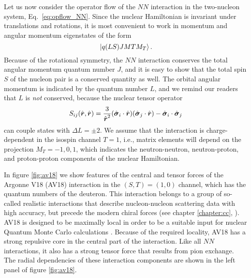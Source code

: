 Let us now consider the operator flow of the $NN$ interaction
in the two-nucleon system, Eq.~\eqref{eq:opflow_NN}. Since the nuclear Hamiltonian is invariant
under translations and rotations, it is most convenient to work in
momentum and angular momentum eigenstates of the form
\begin{equation}
  \,|{q(LS)JMTM_T}\rangle\,.
\end{equation}
Because of the rotational symmetry, the $NN$ interaction conserves
the total angular momentum quantum number $J$, and it is easy to show 
that the total spin $S$ of the nucleon pair is a conserved quantity as 
well. The
orbital angular momentum is indicated by the quantum number $L$,
and we remind our readers that $L$ is \emph{not} conserved, because
the nuclear tensor operator
\begin{equation}
  S_{ij}(\rOV,\rOV) = \frac{3}{\rOV^2}(\sigmaOV_i\cdot\rOV)(\sigmaOV_j\cdot\rOV)-\sigmaOV_i\cdot\sigmaOV_{j}
\end{equation}
can couple states with $\Delta L = \pm 2$. We
assume that the interaction is charge-dependent in the isospin channel
$T=1$, i.e., matrix elements will depend on the projection $M_T=-1,0,1$, 
which indicates the neutron-neutron, neutron-proton, and proton-proton 
components of the nuclear Hamiltonian. 


In figure \ref{fig:av18} we show features of the central 
and tensor forces of the Argonne V18 (AV18) interaction \cite{Wiringa:1995or}
in the $(S,T)=(1,0)$ channel, which has the quantum numbers of the deuteron. This 
interaction belongs to a group of so-called
realistic interactions that describe nucleon-nucleon scattering data
with high accuracy, but precede the modern chiral forces (see
chapter \ref{chapter:cc}, \cite{Epelbaum:2009ve,Machleidt:2011bh}). AV18
is designed to be maximally local in order to be a suitable input for
nuclear Quantum Monte Carlo calculations \cite{Carlson:2015lq,Gezerlis:2014zr,
Lynn:2016ec}. Because of the required locality, AV18 has a strong repulsive
core in the central part of the interaction. Like all $NN$ interactions,
it also has a strong tensor force that results from pion exchange. The
radial dependencies of these interaction components are shown in the left
panel of figure \ref{fig:av18}. 

